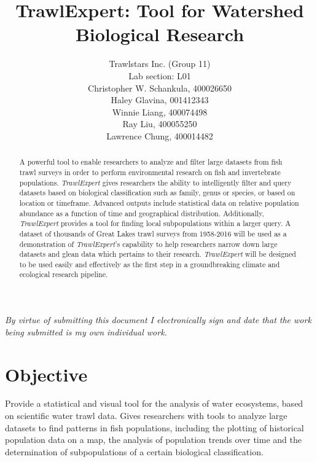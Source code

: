 \documentclass{article}
\begin{document}
\title{TrawlExpert: Tool for Watershed Biological Research}
\author{Trawlstars Inc. (Group 11) \\ Lab section: L01  \\ Christopher W. Schankula, 400026650 \\ Haley Glavina, 001412343 \\ Winnie Liang, 400074498 \\ Ray Liu, 400055250 \\ Lawrence Chung, 400014482}

\maketitle
\noindent\textit{By virtue of submitting this document I electronically sign and date that the work being submitted is my own individual work.}

\begin{abstract}
\noindent A powerful tool to enable researchers to analyze and filter large datasets from fish trawl surveys in order to perform environmental research on fish and invertebrate populations. \textit{TrawlExpert} gives researchers the ability to intelligently filter and query datasets based on biological classification such as family, genus or species, or based on location or timeframe. Advanced outputs include statistical data on relative population abundance as a function of time and geographical distribution. Additionally, \textit{TrawlExpert} provides a tool for finding local subpopulations within a larger query. A dataset of thousands of Great Lakes trawl surveys from 1958-2016 will be used as a demonstration of \textit{TrawlExpert}'s capability to help researchers narrow down large datasets and glean data which pertains to their research. \textit{TrawlExpert} will be designed to be used easily and effectively as the first step in a groundbreaking climate and ecological research pipeline.
\end{abstract}

\section{Objective}
Provide a statistical and visual tool for the analysis of water ecosystems, based on scientific water trawl data. Gives researchers with tools to analyze large datasets to find patterns in fish populations, including the plotting of historical population data on a map, the analysis of population trends over time and the determination of subpopulations of a certain biological classification.
\end{document}
